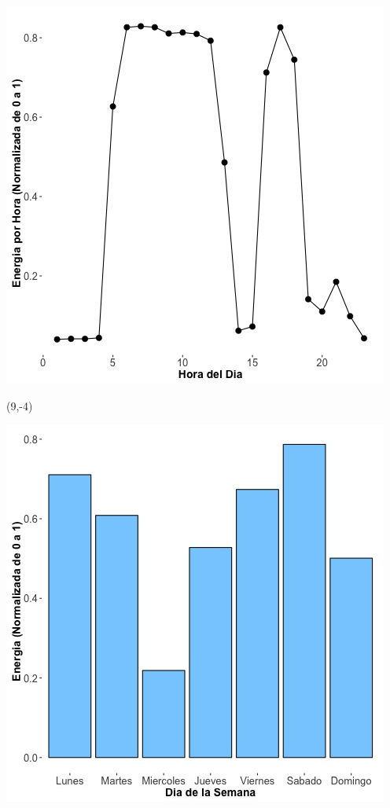 \documentclass{article}\usepackage[]{graphicx}\usepackage[]{color}
\newenvironment{knitrout}{}{} %
\begin{document}
\begin{knitrout}
\color{fgcolor}
\includegraphics[scale=0.65]{figure/A14_plot_norm_median} 
\end{knitrout}


 \begin{textblock}{1}(9,-4)
\begin{minipage}{20em}
\begingroup

\endgroup
\end{minipage}
\end{textblock}


\begin{knitrout}
\color{fgcolor}
\includegraphics[scale=0.65]{figure/A14_day_of_week_plot} 
\end{knitrout}
\end{document}
